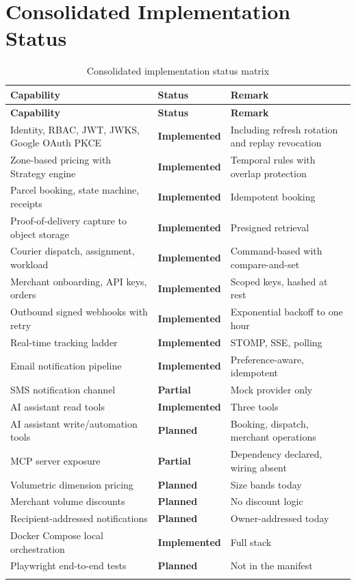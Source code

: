 \documentclass[11pt,a4paper,oneside,openany]{report}
\newcommand{\Impl}{\textbf{Implemented}}
\newcommand{\Partial}{\textbf{Partial}}
\newcommand{\Planned}{\textbf{Planned}}
\begin{document}
\section{Consolidated Implementation Status}\label{sec:statusmatrix}
\begin{center}
\small
\begin{longtable}{@{}p{6.4cm}p{2.3cm}p{5.1cm}@{}}
\toprule
\textbf{Capability} & \textbf{Status} & \textbf{Remark} \\
\midrule
\endfirsthead
\toprule
\textbf{Capability} & \textbf{Status} & \textbf{Remark} \\
\midrule
\endhead
Identity, RBAC, JWT, JWKS, Google OAuth PKCE & \Impl & Including refresh rotation and replay
revocation \\
Zone-based pricing with Strategy engine & \Impl & Temporal rules with overlap protection \\
Parcel booking, state machine, receipts & \Impl & Idempotent booking \\
Proof-of-delivery capture to object storage & \Impl & Presigned retrieval \\
Courier dispatch, assignment, workload & \Impl & Command-based with compare-and-set \\
Merchant onboarding, API keys, orders & \Impl & Scoped keys, hashed at rest \\
Outbound signed webhooks with retry & \Impl & Exponential backoff to one hour \\
Real-time tracking ladder & \Impl & STOMP, SSE, polling \\
Email notification pipeline & \Impl & Preference-aware, idempotent \\
SMS notification channel & \Partial & Mock provider only \\
AI assistant read tools & \Impl & Three tools \\
AI assistant write/automation tools & \Planned & Booking, dispatch, merchant operations \\
MCP server exposure & \Partial & Dependency declared, wiring absent \\
Volumetric dimension pricing & \Planned & Size bands today \\
Merchant volume discounts & \Planned & No discount logic \\
Recipient-addressed notifications & \Planned & Owner-addressed today \\
Docker Compose local orchestration & \Impl & Full stack \\
Playwright end-to-end tests & \Planned & Not in the manifest \\
\bottomrule
\caption{Consolidated implementation status matrix}\label{tab:statusmatrix}
\end{longtable}
\end{center}
\end{document}
